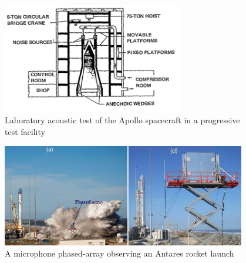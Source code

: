 \documentclass[]{aiaa-tc}%
\begin{document}
\begin{figure}[htb]
\begin{center}
\includegraphics[width=0.7\textwidth]{Images/Himelblau_Fig38.png}
\caption{Laboratory acoustic test of the Apollo spacecraft in a progressive test facility \cite{SpaceVehicleAeroacousticVibrationPrediction}}
\label{ProgressiveTest}
\end{center}
\end{figure}

\begin{figure}[htb]
\begin{center}
\includegraphics[width=0.95\textwidth]{Images/MicrophonePhasedArray.png}
\caption{A microphone phased-array observing an Antares rocket launch \cite{MicrophonePhasedArray}}
\label{MicrophoneArrayPic}
\end{center}
\end{figure}
\end{document}
